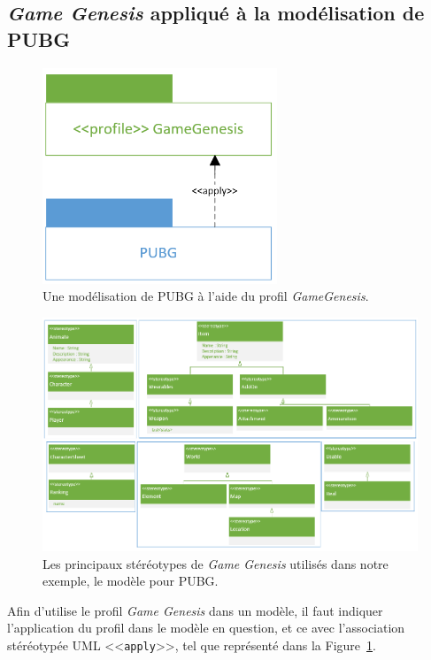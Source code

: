 \subsection{\emph{Game Genesis} appliqué à la modélisation de PUBG}

\begin{figure}
    \centering
    \includegraphics[width=7cm]{10_img/chap6/profile_gg_apply_pubg.PNG}
    \caption{Une modélisation de PUBG \`a l'aide du profil \emph{GameGenesis}.}
    \label{fig.modelisation_application}
\end{figure}

\begin{figure}
    \centering
    \includegraphics[width=\linewidth]{10_img/chap6/final_profile.PNG}
    \caption{Les principaux stéréotypes de \emph{Game Genesis} utilisés dans notre exemple, le mod\`ele pour PUBG.}
    \label{fig.racine_stereo}
\end{figure}


Afin d'utilise le profil \emph{Game Genesis} dans un modèle, il faut indiquer l'application du profil dans le modèle en question, et ce avec l'association st\'er\'eotyp\'ee UML <<\texttt{apply}>>, tel que représenté dans la Figure~\ref{fig.modelisation_application}.


